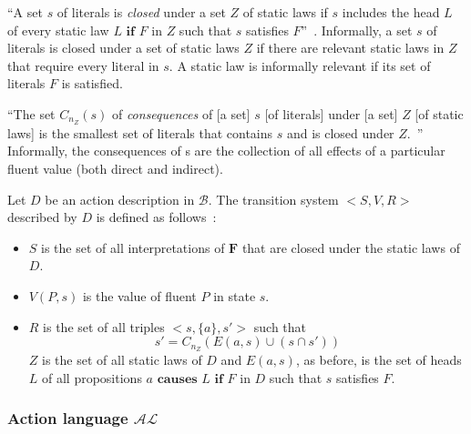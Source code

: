 \begin{definition}
    ``A set $s$ of literals is \textit{closed} under a set $Z$ of static laws if $s$ includes the head $L$ of every static law $L \textbf{ if } F$ in $Z$ such that $s$ satisfies $F$''~\citep{gelfond_action_1998}.
    Informally, a set $s$ of literals is closed under a set of static laws $Z$ if there are relevant static laws in $Z$ that require every literal in $s$.
    A static law is informally relevant if its set of literals $F$ is satisfied.
\end{definition}

\begin{definition}
    ``The set $C_{n_Z}\left(s\right)$ of \textit{consequences} of [a set] $s$ [of literals] under [a set] $Z$ [of static laws] is the smallest set of literals that contains $s$ and is closed under $Z$.~\citep{gelfond_action_1998}''
    Informally, the consequences of s are the collection of all effects of a particular fluent value (both direct and indirect).
\end{definition}

\begin{definition}
    Let $D$ be an action description in $\mathcal{B}$.
    The transition system $< S, V, R >$ described by $D$ is defined as follows~\citep{gelfond_action_1998}:

    \begin{itemize}
        \item $S$ is the set of all interpretations of $\boldsymbol{F}$ that are closed under the static laws of $D$.
        \item $ V(P, s) $ is the value of fluent $P$ in state $s$.
        \item $R$ is the set of all triples $<s, \{a\}, s'>$ such that
            \begin{equation}
                s'=C_{n_Z}\left(E\left(a,s\right)\cup\left(s \cap s'\right)\right)
            \end{equation}
            $ Z $ is the set of all static laws of $D$ and $E(a, s)$, as before, is the set of heads $L$ of all propositions $a \textbf{ causes } L \textbf{ if } F$ in $D$ such that $s$ satisfies $F$.
    \end{itemize}
\end{definition}

\subsubsection{Action language $ \mathcal{AL} $}
\label{subsubsec:action_language_al}

